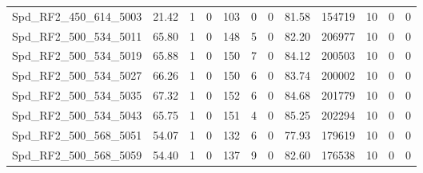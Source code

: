 \begin{longtable}[c]{@{}lrrrrrrrrrrr@{}}
Spd\_RF2\_450\_614\_5003      & 21.42                  & 1                       & 0                       & 103                    & 0                       & 0                       & 81.58                   & 154719                   & 10                       & 0                        & 0                        \\
Spd\_RF2\_500\_534\_5011      & 65.80                  & 1                       & 0                       & 148                    & 5                       & 0                       & 82.20                   & 206977                   & 10                       & 0                        & 0                        \\
Spd\_RF2\_500\_534\_5019      & 65.88                  & 1                       & 0                       & 150                    & 7                       & 0                       & 84.12                   & 200503                   & 10                       & 0                        & 0                        \\
Spd\_RF2\_500\_534\_5027      & 66.26                  & 1                       & 0                       & 150                    & 6                       & 0                       & 83.74                   & 200002                   & 10                       & 0                        & 0                        \\
Spd\_RF2\_500\_534\_5035      & 67.32                  & 1                       & 0                       & 152                    & 6                       & 0                       & 84.68                   & 201779                   & 10                       & 0                        & 0                        \\
Spd\_RF2\_500\_534\_5043      & 65.75                  & 1                       & 0                       & 151                    & 4                       & 0                       & 85.25                   & 202294                   & 10                       & 0                        & 0                        \\
Spd\_RF2\_500\_568\_5051      & 54.07                  & 1                       & 0                       & 132                    & 6                       & 0                       & 77.93                   & 179619                   & 10                       & 0                        & 0                        \\
Spd\_RF2\_500\_568\_5059      & 54.40                  & 1                       & 0                       & 137                    & 9                       & 0                       & 82.60                   & 176538                   & 10                       & 0                        & 0                        \\

\end{longtable}
